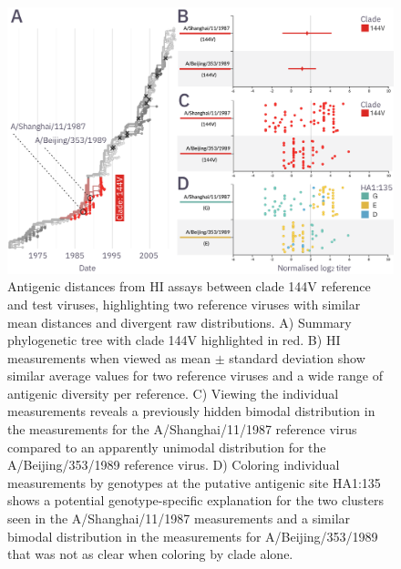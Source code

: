 \documentclass[utf8]{FrontiersinHarvard} %
\begin{document}
\begin{figure}[h!]
  \begin{center}
    \includegraphics[width=\textwidth]{figures/figure-4.png}
  \end{center}
  \caption{
    Antigenic distances from HI assays between clade 144V reference and test viruses, highlighting two reference viruses with similar mean distances and divergent raw distributions.
    A) Summary phylogenetic tree with clade 144V highlighted in red.
    B) HI measurements when viewed as mean $\pm$ standard deviation show similar average values for two reference viruses and a wide range of antigenic diversity per reference.
    C) Viewing the individual measurements reveals a previously hidden bimodal distribution in the measurements for the A/Shanghai/11/1987 reference virus compared to an apparently unimodal distribution for the A/Beijing/353/1989 reference virus.
    D) Coloring individual measurements by genotypes at the putative antigenic site HA1:135 shows a potential genotype-specific explanation for the two clusters seen in the A/Shanghai/11/1987 measurements and a similar bimodal distribution in the measurements for A/Beijing/353/1989 that was not as clear when coloring by clade alone.
  }
  \label{fig:4}
\end{figure}

\end{document}
